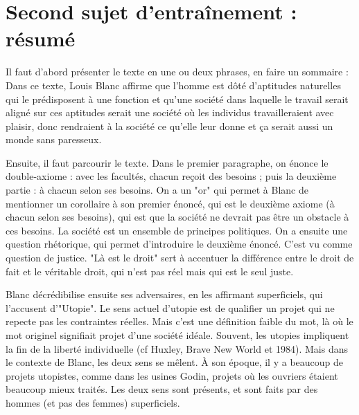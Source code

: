 \documentclass[a4paper,12pt]{book}
\begin{document}
\section{Second sujet d'entraînement : résumé}
Il faut d'abord présenter le texte en une ou deux phrases, en faire un sommaire : Dans ce texte, Louis Blanc affirme que l'homme est dôté d'aptitudes naturelles qui le prédisposent à une fonction et qu'une société dans laquelle le travail serait aligné sur ces aptitudes serait une société où les individus travailleraient avec plaisir, donc rendraient à la société ce qu'elle leur donne et ça serait aussi un monde sans paresseux.
\par Ensuite, il faut parcourir le texte. Dans le premier paragraphe, on énonce le double-axiome : avec les facultés, chacun reçoit des besoins ; puis la deuxième partie : à chacun selon ses besoins. On a un "or" qui permet à Blanc de mentionner un corollaire à son premier énoncé, qui est le deuxième axiome (à chacun selon ses besoins), qui est que la société ne devrait pas être un obstacle à ces besoins. La société est un ensemble de principes politiques. On a ensuite une question rhétorique, qui permet d'introduire le deuxième énoncé. C'est vu comme question de justice. "Là est le droit" sert à accentuer la différence entre le droit de fait et le véritable droit, qui n'est pas réel mais qui est le seul juste.
\par Blanc décrédibilise ensuite ses adversaires, en les affirmant superficiels, qui l'accusent d'"Utopie". Le sens actuel d'utopie est de qualifier un projet qui ne repecte pas les contraintes réelles. Mais c'est une définition faible du mot, là où le mot originel signifiait projet d'une société idéale. Souvent, les utopies impliquent la fin de la liberté individuelle (cf Huxley, Brave New World et 1984). Mais dans le contexte de Blanc, les deux sens se mêlent. À son époque, il y a beaucoup de projets utopistes, comme dans les usines Godin, projets où les ouvriers étaient beaucoup mieux traités. Les deux sens sont présents, et sont faits par des hommes (et pas des femmes) superficiels.
\end{document}
